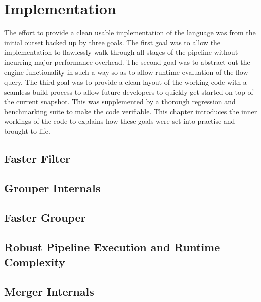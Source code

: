 \chapter{Implementation}\label{ch:implementation}

The effort to provide a clean usable implementation of the language was from
the initial outset backed up by three goals. The first goal was to allow the
implementation to flawlessly walk through all stages of the pipeline without
incurring major performance overhead. The second goal was to abstract out the
engine functionality in such a way so as to allow runtime evaluation of the
flow query. The third goal was to provide a clean layout of the working code
with a seamless build process to allow future developers to quickly get
started on top of the current snapshot. This was supplemented by a thorough
regression and benchmarking suite to make the code verifiable. This chapter
introduces the inner workings of the code to explains how these goals were set
into practise and brought to life.

\section{Faster Filter}\label{sec:faster-filter}

\section{Grouper Internals}\label{sec:grouper-internals}

\section{Faster Grouper}\label{sec:faster-grouper}

\section{Robust Pipeline Execution and Runtime Complexity}\label{sec:pipeline}

\section{Merger Internals}\label{sec:merger-internals}

